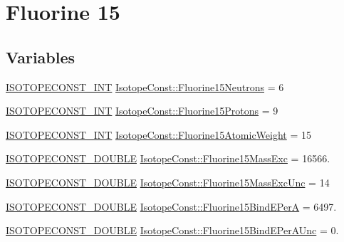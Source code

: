 \hypertarget{group___isotope_const-_fluorine-_f15}{}\section{Fluorine 15}
\label{group___isotope_const-_fluorine-_f15}
\subsection*{Variables}
\begin{DoxyCompactItemize}
\item 
\mbox{\hyperlink{group___isotope_const-_macros_ga5f18360b3e99483a35c32d789e62621c}{I\+S\+O\+T\+O\+P\+E\+C\+O\+N\+S\+T\+\_\+\+I\+NT}} \mbox{\hyperlink{group___isotope_const-_fluorine-_f15_ga13cb633bab3d79012dcfe0de37879903}{Isotope\+Const\+::\+Fluorine15\+Neutrons}} = 6
\item 
\mbox{\hyperlink{group___isotope_const-_macros_ga5f18360b3e99483a35c32d789e62621c}{I\+S\+O\+T\+O\+P\+E\+C\+O\+N\+S\+T\+\_\+\+I\+NT}} \mbox{\hyperlink{group___isotope_const-_fluorine-_f15_gabbcd6372dadc15de97d7b5866b74b21e}{Isotope\+Const\+::\+Fluorine15\+Protons}} = 9
\item 
\mbox{\hyperlink{group___isotope_const-_macros_ga5f18360b3e99483a35c32d789e62621c}{I\+S\+O\+T\+O\+P\+E\+C\+O\+N\+S\+T\+\_\+\+I\+NT}} \mbox{\hyperlink{group___isotope_const-_fluorine-_f15_gabfac3c09ed658b4ef5f64a78e0e297e5}{Isotope\+Const\+::\+Fluorine15\+Atomic\+Weight}} = 15
\item 
\mbox{\hyperlink{group___isotope_const-_macros_ga8f45a7272ce02c0b4c65c44636ed719a}{I\+S\+O\+T\+O\+P\+E\+C\+O\+N\+S\+T\+\_\+\+D\+O\+U\+B\+LE}} \mbox{\hyperlink{group___isotope_const-_fluorine-_f15_ga86003a0af4ef835ee9bc06aab9007b99}{Isotope\+Const\+::\+Fluorine15\+Mass\+Exc}} = 16566.
\item 
\mbox{\hyperlink{group___isotope_const-_macros_ga8f45a7272ce02c0b4c65c44636ed719a}{I\+S\+O\+T\+O\+P\+E\+C\+O\+N\+S\+T\+\_\+\+D\+O\+U\+B\+LE}} \mbox{\hyperlink{group___isotope_const-_fluorine-_f15_ga33962ca1c923802bd948c8e9f84c04bb}{Isotope\+Const\+::\+Fluorine15\+Mass\+Exc\+Unc}} = 14
\item 
\mbox{\hyperlink{group___isotope_const-_macros_ga8f45a7272ce02c0b4c65c44636ed719a}{I\+S\+O\+T\+O\+P\+E\+C\+O\+N\+S\+T\+\_\+\+D\+O\+U\+B\+LE}} \mbox{\hyperlink{group___isotope_const-_fluorine-_f15_gac0bfef2130031ba6357b5f16ecc74a09}{Isotope\+Const\+::\+Fluorine15\+Bind\+E\+PerA}} = 6497.
\item 
\mbox{\hyperlink{group___isotope_const-_macros_ga8f45a7272ce02c0b4c65c44636ed719a}{I\+S\+O\+T\+O\+P\+E\+C\+O\+N\+S\+T\+\_\+\+D\+O\+U\+B\+LE}} \mbox{\hyperlink{group___isotope_const-_fluorine-_f15_ga8d42f715de54ff3f130a5210b6e11065}{Isotope\+Const\+::\+Fluorine15\+Bind\+E\+Per\+A\+Unc}} = 0.

\end{DoxyCompactItemize}
